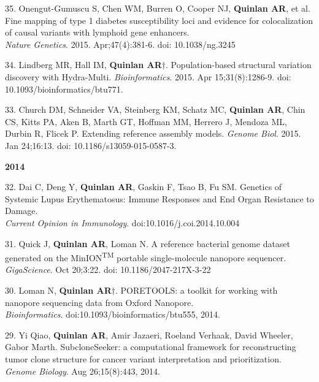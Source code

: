 \documentclass[margin,line]{cv}
\begin{document}
\begin{resume}
\begin{list}{*}{}
    \item[35.] Onengut-Gumuscu S, Chen WM, Burren O, Cooper NJ, \textbf{Quinlan AR}, et al.
    Fine mapping of type 1 diabetes susceptibility loci and evidence for colocalization of causal variants with lymphoid gene enhancers.\\
    \emph{Nature Genetics}. 2015. Apr;47(4):381-6. doi: 10.1038/ng.3245

    \item[34.] Lindberg MR, Hall IM, \textbf{Quinlan AR}$\dagger$.
    Population-based structural variation discovery with Hydra-Multi.
    \emph{Bioinformatics}. 2015. Apr 15;31(8):1286-9. doi: 10.1093/bioinformatics/btu771.

    \item[33.] Church DM, Schneider VA, Steinberg KM, Schatz MC, \textbf{Quinlan AR}, Chin CS, Kitts PA, Aken B, Marth GT,
    Hoffman MM, Herrero J, Mendoza ML, Durbin R, Flicek P.
    Extending reference assembly models.
    \emph{Genome Biol}. 2015. Jan 24;16:13. doi: 10.1186/s13059-015-0587-3.
    \end{list}


    \textbf{2014} \\

    \begin{list}{*}{}

    \item[32.] Dai C, Deng Y, \textbf{Quinlan AR}, Gaskin F, Tsao B, Fu SM.
    Genetics of Systemic Lupus Erythematosus: Immune Responses and End Organ Resistance to Damage.\\
    \emph{Current Opinion in Immunology}. doi:10.1016/j.coi.2014.10.004

    \item[31.] Quick J, \textbf{Quinlan AR}, Loman N.
    A reference bacterial genome dataset generated on the MinION\textsuperscript{TM} portable single-molecule nanopore sequencer.\\
    \emph{GigaScience}. Oct 20;3:22. doi: 10.1186/2047-217X-3-22

    \item[30.] Loman N, \textbf{Quinlan AR}$\dagger$.
    PORETOOLS: a toolkit for working with nanopore sequencing data from Oxford Nanopore.\\
    \emph{Bioinformatics}. doi:10.1093/bioinformatics/btu555, 2014.

    \item[29.] Yi Qiao, \textbf{Quinlan AR}, Amir Jazaeri, Roeland Verhaak, David Wheeler, Gabor Marth.
    SubcloneSeeker: a computational framework for reconstructing tumor clone structure for cancer variant interpretation and prioritization.\\
    \emph{Genome Biology}. Aug 26;15(8):443, 2014.


\end{list}
\end{resume}
\end{document}
